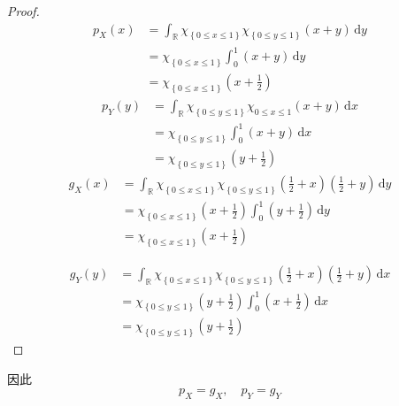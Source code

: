 \documentclass[../main.tex]{subfiles}
\begin{document}
\begin{proof}
    \begin{equation}
        \begin{aligned}
            p_{X}\left( x \right)&=  \int_{\mathbb{R} }\chi _{\left\{ 0\le x\le 1 \right\}}\chi _{\left\{ 0\le y\le 1 \right\}}\left( x+ y \right)\,\mathrm{d} y  \\ 
             &= \chi _{\left\{ 0\le x\le 1 \right\}}\int_{0}^{1}\left( x+ y \right)\,\mathrm{d} y\\ 
              &= \chi _{\left\{ 0\le x\le 1 \right\}}\left( x+ \frac{1 }{2 }  \right)  
        \end{aligned}
    \end{equation}
    \begin{equation}
        \begin{aligned}
            p_{Y}\left( y \right)&= \int_{\mathbb{R} }\chi _{\left\{ 0\le y\le 1 \right\}} \chi _{0\le x\le 1}\left( x+ y \right)\,\mathrm{d} x\\ 
             &=  \chi _{\left\{ 0\le y\le 1 \right\}}\int_{0}^{1}\left( x+ y \right)\,\mathrm{d} x \\ 
              &= \chi _{\left\{ 0\le y\le 1 \right\}}\left( y+ \frac{1 }{2 }  \right) 
        \end{aligned}
    \end{equation}
\begin{equation}
    \begin{aligned}
          g_{X}\left( x \right)&= \int_{\mathbb{R} }\chi _{\left\{ 0\le x\le 1 \right\}}\chi _{\left\{ 0\le y\le 1 \right\}}\left(\frac{1 }{2 }+ x  \right)  \left( \frac{1 }{2 }+ y  \right)  \,\mathrm{d} y\\ 
           &= \chi _{\left\{ 0\le x\le 1 \right\}}\left( x+ \frac{1 }{2 }  \right) \int_{0}^{1}\left( y+ \frac{1 }{2 }  \right)\,\mathrm{d} y \\ 
            &= \chi _{\left\{ 0\le x\le 1 \right\}}\left( x+ \frac{1 }{2 }  \right) 
    \end{aligned}
\end{equation}

\begin{equation}
    \begin{aligned}
        g_{Y}\left( y \right)&= \int_{\mathbb{R} }\chi _{\left\{ 0\le x\le 1 \right\}}\chi _{\left\{ 0\le y\le 1 \right\}}\left( \frac{1 }{2 }+ x  \right)\left( \frac{1 }{2 }+ y  \right)\,\mathrm{d} x\\ 
         &= \chi _{\left\{ 0\le y\le 1 \right\}}\left( y+ \frac{1 }{2 }  \right)\int_{0}^{1}\left( x+ \frac{1 }{2 }  \right)\,\mathrm{d} x\\ 
          &= \chi _{\left\{ 0\le y\le 1 \right\}}\left( y+ \frac{1 }{2 }  \right)      
    \end{aligned}
\end{equation}
\end{proof}因此 \[
p_{X}= g_{X},\quad p_{Y}= g_{Y}
\]
\end{document}
